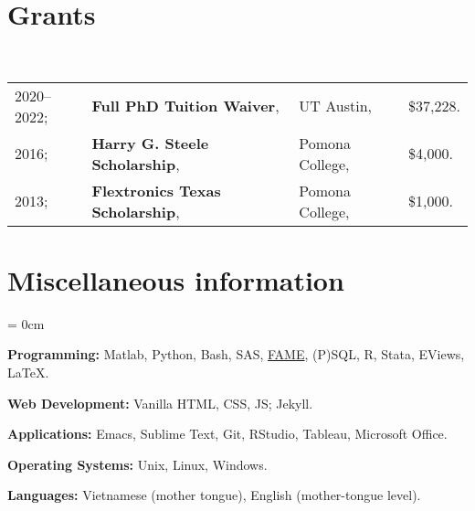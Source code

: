 \documentclass[a4paper, 10pt]{article}
\begin{document}
  \section{Grants}
  ~\begin{tabular}{llll}
    2020--2022; & \textbf{Full PhD Tuition Waiver}, & UT Austin, & \$37,228.\\
    2016; & \textbf{Harry G. Steele Scholarship}, & Pomona College, & \$4,000.\\
    2013; & \textbf{Flextronics Texas Scholarship}, & Pomona College, & \$1,000.
  \end{tabular}
  \vspace*{0.25em}
    
  \section{Miscellaneous information}
  \begin{compactitem}\parskip = 0cm
    \item \textbf{Programming:} Matlab, Python, Bash, SAS, \href{https://en.wikipedia.org/wiki/FAME_(database)}{FAME}, (P)SQL, R, Stata, EViews, \LaTeX.
    \item \textbf{Web Development:} Vanilla HTML, CSS, JS; Jekyll.
    \item \textbf{Applications:} Emacs, Sublime Text, Git, RStudio, Tableau, Microsoft Office.
    \item \textbf{Operating Systems:} Unix, Linux, Windows.
    \item \textbf{Languages:} Vietnamese (mother tongue), English (mother-tongue level).
  \end{compactitem}
\end{document}
